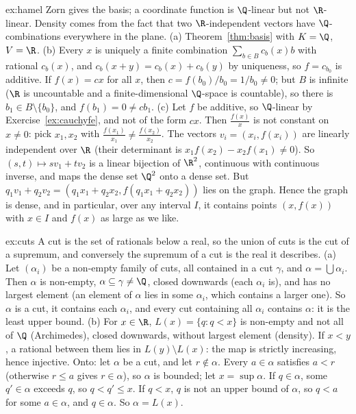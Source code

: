 \begin{solution}{ex:hamel}
\idea Zorn gives the basis; a coordinate function is $\Q$-linear but not $\R$-linear. Density comes from the fact that two $\R$-independent
vectors have $\Q$-combinations everywhere in the plane.
\writeup (a) Theorem~\ref{thm:basis} with $K=\Q$, $V=\R$. (b) Every $x$ is uniquely a finite combination $\sum_{b\in B}c_b(x)b$ with rational $c_b(x)$, and
$c_b(x+y)=c_b(x)+c_b(y)$ by uniqueness, so $f=c_{b_0}$ is additive. If $f(x)=cx$ for all $x$, then $c=f(b_0)/b_0=1/b_0\ne0$; but $B$ is infinite
($\R$ is uncountable and a finite-dimensional $\Q$-space is countable), so there is $b_1\in B\setminus\{b_0\}$, and $f(b_1)=0\ne cb_1$.
(c) Let $f$ be additive, so $\Q$-linear by Exercise~\ref{ex:cauchyfe}, and not of the form $cx$. Then $\frac{f(x)}x$ is not constant on $x\ne0$: pick $x_1,x_2$ with
$\frac{f(x_1)}{x_1}\ne\frac{f(x_2)}{x_2}$. The vectors $v_i=(x_i,f(x_i))$ are linearly independent over $\R$ (their determinant is $x_1f(x_2)-x_2f(x_1)\ne0$). So
$(s,t)\mapsto sv_1+tv_2$ is a linear bijection of $\R^2$, continuous with continuous inverse, and maps the dense set $\Q^2$ onto a dense set. But
$q_1v_1+q_2v_2=(q_1x_1+q_2x_2,f(q_1x_1+q_2x_2))$ lies on the graph. Hence the graph is dense, and in particular, over any interval $I$, it
contains points $(x,f(x))$ with $x\in I$ and $f(x)$ as large as we like.
\end{solution}

\begin{solution}{ex:cuts}
\idea A cut is the set of rationals below a real, so the union of cuts is the cut of a supremum, and conversely the supremum of a cut is the
real it describes.
\writeup (a) Let $(\alpha_i)$ be a non-empty family of cuts, all contained in a cut $\gamma$, and $\alpha=\bigcup\alpha_i$. Then $\alpha$ is non-empty, $\alpha\subseteq\gamma\ne\Q$,
closed downwards (each $\alpha_i$ is), and has no largest element (an element of $\alpha$ lies in some $\alpha_i$, which contains a larger one). So $\alpha$ is
a cut, it contains each $\alpha_i$, and every cut containing all $\alpha_i$ contains $\alpha$: it is the least upper bound.
(b) For $x\in\R$, $L(x)=\{q:q<x\}$ is non-empty and not all of $\Q$ (Archimedes), closed downwards, without largest element (density). If
$x<y$, a rational between them lies in $L(y)\setminus L(x)$: the map is strictly increasing, hence injective. Onto: let $\alpha$ be a cut, and let $r\notin\alpha$.
Every $a\in\alpha$ satisfies $a<r$ (otherwise $r\le a$ gives $r\in\alpha$), so $\alpha$ is bounded; let $x=\sup\alpha$. If $q\in\alpha$, some $q'\in\alpha$ exceeds $q$, so
$q<q'\le x$. If $q<x$, $q$ is not an upper bound of $\alpha$, so $q<a$ for some $a\in\alpha$, and $q\in\alpha$. So $\alpha=L(x)$.
\end{solution}

